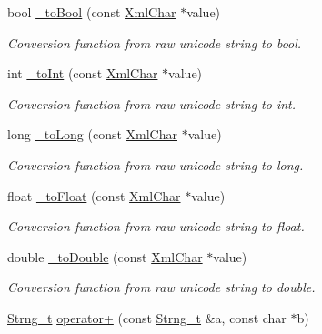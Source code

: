 \begin{DoxyCompactItemize}
bool \hyperlink{group___d_d4_h_e_p___x_m_l_ga4f06ff5f1ca607223cda870587170546}{\+\_\+to\+Bool} (const \hyperlink{namespace_d_d4hep_1_1_x_m_l_a09e5d9cc86ed782f6826dfe0778c1815}{Xml\+Char} $\ast$value)
\begin{DoxyCompactList}\small\item\em Conversion function from raw unicode string to bool. \end{DoxyCompactList}\item 
int \hyperlink{group___d_d4_h_e_p___x_m_l_ga8b2fbc55c4631087c0c5e905327f04d0}{\+\_\+to\+Int} (const \hyperlink{namespace_d_d4hep_1_1_x_m_l_a09e5d9cc86ed782f6826dfe0778c1815}{Xml\+Char} $\ast$value)
\begin{DoxyCompactList}\small\item\em Conversion function from raw unicode string to int. \end{DoxyCompactList}\item 
long \hyperlink{group___d_d4_h_e_p___x_m_l_ga0da6cdd75009487075f485c74a034a7b}{\+\_\+to\+Long} (const \hyperlink{namespace_d_d4hep_1_1_x_m_l_a09e5d9cc86ed782f6826dfe0778c1815}{Xml\+Char} $\ast$value)
\begin{DoxyCompactList}\small\item\em Conversion function from raw unicode string to long. \end{DoxyCompactList}\item 
float \hyperlink{group___d_d4_h_e_p___x_m_l_ga74d0ba6278b3baa645887da2151279ee}{\+\_\+to\+Float} (const \hyperlink{namespace_d_d4hep_1_1_x_m_l_a09e5d9cc86ed782f6826dfe0778c1815}{Xml\+Char} $\ast$value)
\begin{DoxyCompactList}\small\item\em Conversion function from raw unicode string to float. \end{DoxyCompactList}\item 
double \hyperlink{group___d_d4_h_e_p___x_m_l_gace8029e843a4c94cf50bd9adc32cd6f6}{\+\_\+to\+Double} (const \hyperlink{namespace_d_d4hep_1_1_x_m_l_a09e5d9cc86ed782f6826dfe0778c1815}{Xml\+Char} $\ast$value)
\begin{DoxyCompactList}\small\item\em Conversion function from raw unicode string to double. \end{DoxyCompactList}\item 
\hyperlink{class_d_d4hep_1_1_x_m_l_1_1_strng__t}{Strng\+\_\+t} \hyperlink{group___d_d4_h_e_p___x_m_l_gad7c5e5c9ad994b97f08eec6e7829e23f}{operator+} (const \hyperlink{class_d_d4hep_1_1_x_m_l_1_1_strng__t}{Strng\+\_\+t} \&a, const char $\ast$b)

\end{DoxyCompactItemize}
